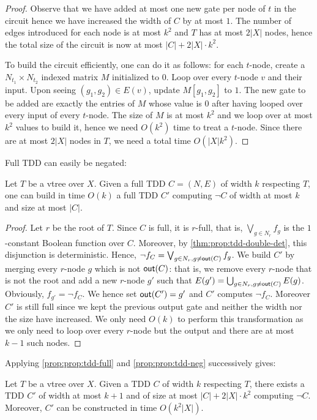 \documentclass[a4paper,UKenglish,cleveref, autoref, thm-restate]{lipics-v2021}
\begin{document}
\begin{toappendix}
\begin{proof}
  Observe that we have added at most one new gate per node of $t$ in the circuit hence we have increased the width of $C$ by at most $1$. The number of edges introduced for each node is at most $k^2$ and $T$ has at most $2|X|$ nodes, hence the total size of the circuit is now at most $|C|+2|X| \cdot k^2$.

  To build the circuit efficiently, one can do it as follows: for each $t$-node, create a $N_{t_1} \times N_{t_2}$ indexed matrix $M$ initialized to $0$. Loop over every $t$-node $v$ and their input. Upon seeing $(g_1,g_2) \in E(v)$, update $M[g_1,g_2]$ to $1$. The new gate to be added are exactly the entries of $M$ whose value is $0$ after having looped over every input of every $t$-node. The size of $M$ is at most $k^2$ and we loop over at most $k^2$ values to build it, hence we need $O(k^2)$ time to treat a $t$-node. Since there are at most $2|X|$ nodes in $T$, we need a total time $O(|X|k^2)$.
\end{proof}

Full TDD can easily be negated:
\begin{proposition}
  \label{prop:prop:tdd-neg} Let $T$ be a vtree over $X$. Given a full TDD $C=(N,E)$ of width $k$ respecting $T$, one can build in time $O(k)$ a full TDD $C'$ computing $\neg C$ of width at most $k$ and size at most $|C|$.
\end{proposition}
\begin{proof}
  Let $r$ be the root of $T$.  Since $C$ is full, it is $r$-full, that is, $\bigvee_{g \in N_r} f_g$ is the $1$-constant Boolean function over $C$. Moreover, by \cref{thm:prop:tdd-double-det}, this disjunction is deterministic. Hence, $\neg f_C = \bigvee_{g \in N_r, g \neq \out} f_g$. We build $C'$ by merging every $r$-node $g$ which is not $\out$: that is, we remove every $r$-node that is not the root and add a new $r$-node $g'$ such that $E(g') = \bigcup_{g \in N_r, g \neq \out} E(g)$. Obviously, $f_{g'} = \neg f_C$. We hence set $\out[C'] = g'$ and $C'$ computes $\neg f_C$. Moreover $C'$ is still full since we kept the previous output gate  and neither the width nor the size have increased. We only need $O(k)$ to perform this transformation as we only need to loop over every $r$-node but the output and there are at most $k-1$ such nodes. 
\end{proof}

Applying \cref{prop:prop:tdd-full} and \cref{prop:prop:tdd-neg} successively gives:
\begin{theorem}
  \label{thm:prop:tdd-neg} Let $T$ be a vtree over $X$. Given a TDD $C$ of width $k$ respecting $T$, there exists a TDD $C'$ of width at most $k+1$ and of size at most $|C|+2|X|\cdot k^2$ computing $\neg C$. Moreover, $C'$ can be constructed in time $O(k^2|X|)$. 
\end{theorem}


\end{toappendix}
\end{document}
